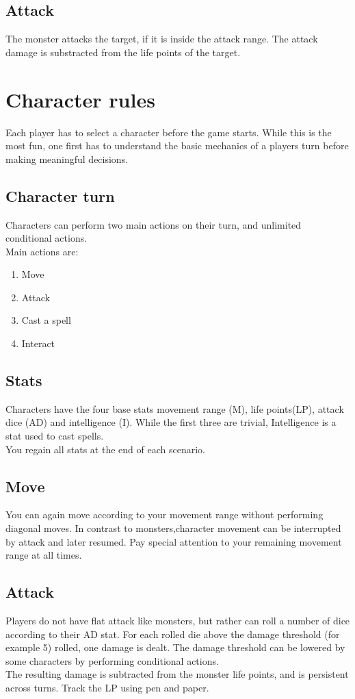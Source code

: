 \subsection{Attack}
The monster attacks the target, if it is inside the attack range. The attack damage is substracted from the life points of the target.

\section{Character rules}
Each player has to select a character before the game starts. While this is the most fun, one first has to understand the basic mechanics of a players turn before making meaningful decisions. 
\subsection{Character turn}
Characters can perform two main actions on their turn, and unlimited conditional actions.\\Main actions are:
\begin{enumerate}
	\item Move
	\item Attack
	\item Cast a spell
	\item Interact
\end{enumerate}

\subsection{Stats}
Characters have the four base stats movement range (M), life points(LP), attack dice (AD) and intelligence (I). While the first three are trivial, Intelligence is a stat used to cast spells. \\ You regain all stats at the end of each scenario.

\subsection{Move}
You can again move according to your movement range without performing diagonal moves. In contrast to monsters,character movement can be interrupted by attack and later resumed. Pay special attention to your remaining movement range at all times.

\subsection{Attack}
Players do not have flat attack like monsters, but rather can roll a number of dice according to their AD stat. For each rolled die above the damage threshold (for example 5) rolled, one damage is dealt. The damage threshold can be lowered by some characters by performing conditional actions. \\ The resulting damage is subtracted from the monster life points, and is persistent across turns. Track the LP using pen and paper.


